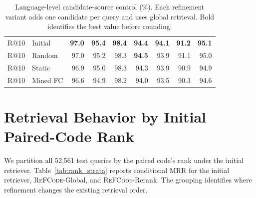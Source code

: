 \documentclass[11pt]{article}
\newcommand{\method}{\textsc{ReFCode}}
\begin{document}
\begin{table}[!t]
\begin{tabular}{llrrrrrrr}
    R@10 & Initial & \textbf{97.0} & \textbf{95.4} & \textbf{98.4} & \textbf{94.4} & \textbf{94.1} & \textbf{91.2} & \textbf{95.1} \\
    R@10 & Random & 97.0 & 95.2 & 98.3 & \textbf{94.5} & 93.9 & 91.1 & 95.0 \\
    R@10 & Static & 96.9 & 95.0 & 98.3 & 94.3 & 93.9 & 90.9 & 94.9 \\
    R@10 & Mined FC & 96.6 & 94.9 & 98.2 & 94.0 & 93.5 & 90.3 & 94.6 \\
    \bottomrule
  \end{tabular}
  \caption{Language-level candidate-source control (\%). Each refinement variant adds one candidate per query and uses global retrieval. Bold identifies the best value before rounding.}
  \label{tab:candidate_language_details}
\end{table}
\section{Retrieval Behavior by Initial Paired-Code Rank}
\label{app:rank_analysis}

We partition all 52,561 test queries by the paired code's rank under the initial retriever. Table~\ref{tab:rank_strata} reports conditional MRR for the initial retriever, \method{}-Global, and \method{}-Rerank. The grouping identifies where refinement changes the existing retrieval order.

\begin{table}[!t]
  \centering
  \scriptsize
  \setlength{\tabcolsep}{1.7pt}
  \caption{MRR (\%) by the paired code's rank under the initial retriever, micro-averaged over test queries.}
  \label{tab:rank_strata}
\end{table}
\end{document}

